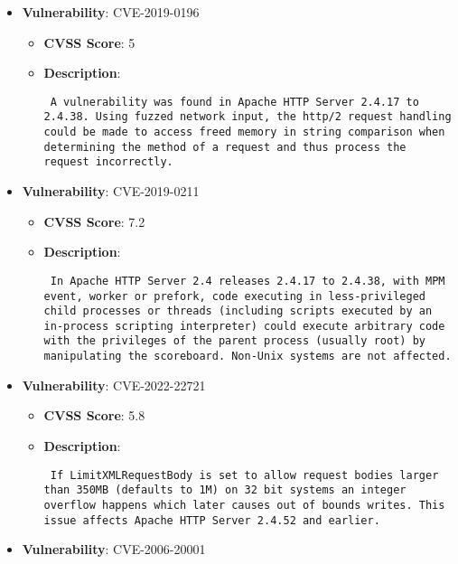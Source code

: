 \documentclass{article}
\begin{document}
\begin{itemize}
\begin{itemize}
{{ }}
        \end{itemize}
    
        \item \textbf{Vulnerability}: CVE-2019-0196
        \begin{itemize}
            \item \textbf{CVSS Score}:  5 
            \item \textbf{Description}: \parbox{\linewidth}{\texttt{ A vulnerability was found in Apache HTTP Server 2.4.17 to 2.4.38. Using fuzzed network input, the http/2 request handling could be made to access freed memory in string comparison when determining the method of a request and thus process the request incorrectly. }}
        \end{itemize}
    
        \item \textbf{Vulnerability}: CVE-2019-0211
        \begin{itemize}
            \item \textbf{CVSS Score}:  7.2 
            \item \textbf{Description}: \parbox{\linewidth}{\texttt{ In Apache HTTP Server 2.4 releases 2.4.17 to 2.4.38, with MPM event, worker or prefork, code executing in less-privileged child processes or threads (including scripts executed by an in-process scripting interpreter) could execute arbitrary code with the privileges of the parent process (usually root) by manipulating the scoreboard. Non-Unix systems are not affected. }}
        \end{itemize}
    
        \item \textbf{Vulnerability}: CVE-2022-22721
        \begin{itemize}
            \item \textbf{CVSS Score}:  5.8 
            \item \textbf{Description}: \parbox{\linewidth}{\texttt{ If LimitXMLRequestBody is set to allow request bodies larger than 350MB (defaults to 1M) on 32 bit systems an integer overflow happens which later causes out of bounds writes. This issue affects Apache HTTP Server 2.4.52 and earlier. }}
        \end{itemize}
    
        \item \textbf{Vulnerability}: CVE-2006-20001
\end{itemize}
\end{document}
